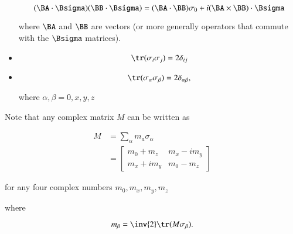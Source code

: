 \begin{itemize}
\begin{equation}\label{eqn:qmTwoL14:570}
(\BA \cdot \Bsigma)
(\BB \cdot \Bsigma)
=
(\BA \cdot \BB) \sigma_0 + i (\BA \times \BB) \cdot \Bsigma
\end{equation}

where $\BA$ and $\BB$ are vectors (or more generally operators that commute with the $\Bsigma$ matrices).

\item

\begin{equation}\label{eqn:qmTwoL14:590}
\tr(\sigma_i \sigma_j) = 2 \delta_{ij}
\end{equation}

\item

\begin{equation}\label{eqn:qmTwoL14:610}
\tr(\sigma_\alpha \sigma_\beta) = 2 \delta_{\alpha \beta},
\end{equation}

where $\alpha, \beta = 0, x, y, z$
\end{itemize}

Note that any complex matrix $M$ can be written as

\begin{equation}\label{eqn:qmTwoL14:920}
\begin{aligned}
M &= \sum_\alpha m_a \sigma_\alpha \\
  &=
\begin{bmatrix}
m_0 + m_z & m_x - i m_y \\
m_x + i m_y & m_0 - m_z
\end{bmatrix}
\end{aligned}
\end{equation}

for any four complex numbers $m_0, m_x, m_y, m_z$

where

\begin{equation}\label{eqn:qmTwoL14:630}
m_\beta = \inv{2} \tr(M \sigma_\beta).
\end{equation}

\EndArticle
